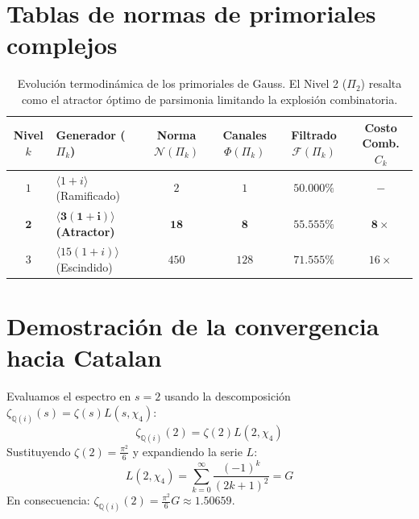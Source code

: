 \documentclass[12pt, a4paper]{article}
\theoremstyle{plain}
\theoremstyle{definition}
\theoremstyle{remark}
\newcommand{\Q}{\mathbb{Q}}
\newcommand{\Norm}{\mathcal{N}}
\begin{document}
\section{Tablas de normas de primoriales complejos}
\label{apendice:tablas_primoriales}

\begin{table}[h!]
\centering
\renewcommand{\arraystretch}{1.5}
\begin{tabular}{|c|l|c|c|c|c|}
\hline
\textbf{Nivel $k$} & \textbf{Generador ($\Pi_k$)} & \textbf{Norma $\Norm(\Pi_k)$} & \textbf{Canales $\Phi(\Pi_k)$} & \textbf{Filtrado $\mathcal{F}(\Pi_k)$} & \textbf{Costo Comb. $C_k$} \\
\hline\hline
$1$ & $\langle 1+i \rangle$ (Ramificado) & $2$ & $1$ & $50.000\%$ & $-$ \\
\hline
$\mathbf{2}$ & $\mathbf{\langle 3(1+i) \rangle}$ \textbf{(Atractor)} & $\mathbf{18}$ & $\mathbf{8}$ & $\mathbf{55.555\%}$ & $\mathbf{8\times}$ \\
\hline
$3$ & $\langle 15(1+i) \rangle$ (Escindido) & $450$ & $128$ & $71.555\%$ & $16\times$ \\
\hline
\end{tabular}
\caption{Evolución termodinámica de los primoriales de Gauss. El Nivel 2 ($\Pi_2$) resalta como el atractor óptimo de parsimonia limitando la explosión combinatoria.}
\label{tabla:primoriales_gauss}
\end{table}

\section{Demostración de la convergencia hacia Catalan}
\label{apendice:demostracion_catalan}

Evaluamos el espectro en $s=2$ usando la descomposición $\zeta_{\Q(i)}(s) = \zeta(s)L(s, \chi_4)$:
\begin{equation}
    \zeta_{\Q(i)}(2) = \zeta(2) L(2, \chi_4)
\end{equation}
Sustituyendo $\zeta(2) = \frac{\pi^2}{6}$ y expandiendo la serie $L$:
\begin{equation}
    L(2, \chi_4) = \sum_{k=0}^{\infty} \frac{(-1)^k}{(2k+1)^2} = G
\end{equation}
En consecuencia: $\zeta_{\Q(i)}(2) = \frac{\pi^2}{6} G \approx 1.50659$.
\end{document}
